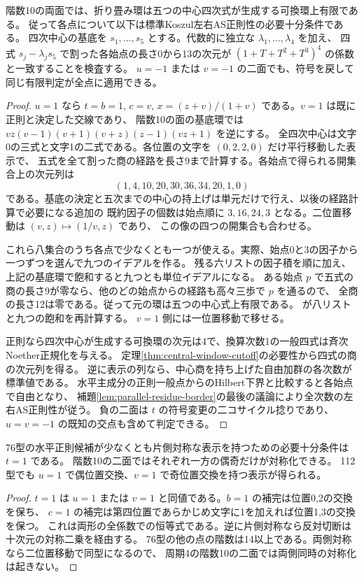 \begin{theorem}\label{thm:first-rectangle-edge-center}
階数10の両面では、折り畳み環は五つの中心四次式が生成する可換環上有限である。
従って各点について以下は標準Koszul左右AS正則性の必要十分条件である。
四次中心の基底を $s_1,\ldots,s_5$ とする。代数的に独立な $\lambda_1,\ldots,\lambda_4$ を加え、
四式 $s_j-\lambda_j s_5$ で割った各始点の長さ0から13の次元が $(1+T+T^2+T^3)^4$ の係数と一致することを検査する。
$u=-1$ または $v=-1$ の二面でも、符号を戻して同じ有限判定が全点に適用できる。
\end{theorem}
\begin{proof}
$u=1$ なら $t=b=1$, $c=v$, $x=(z+v)/(1+v)$ である。$v=1$ は既に正則と決定した交線であり、
階数10の面の基底環では $v z(v-1)(v+1)(v+z)(z-1)(vz+1)$ を逆にする。
全四次中心は文字0の三式と文字1の二式である。各位置の文字を $(0,2,2,0)$ だけ平行移動した表示で、
五式を全て割った商の経路を長さ9まで計算する。各始点で得られる開集合上の次元列は
\[
 (1,4,10,20,30,36,34,20,1,0)
\]
である。基底の決定と五次までの中心の持上げは単元だけで行え、以後の経路計算で必要になる追加の
既約因子の個数は始点順に $3,16,24,3$ となる。二位置移動は $(v,z)\mapsto(1/v,z)$ であり、
この像の四つの開集合も合わせる。

これら八集合のうち各点で少なくとも一つが使える。実際、始点0と3の因子から一つずつを選んで九つのイデアルを作る。
残る六リストの因子積を順に加え、上記の基底環で飽和すると九つとも単位イデアルになる。
ある始点 $p$ で五式の商の長さ9が零なら、他のどの始点からの経路も高々三歩で $p$ を通るので、
全商の長さ12は零である。従って元の環は五つの中心式上有限である。
 が八リストと九つの飽和を再計算する。
$v=1$ 側には一位置移動で移せる。

正則なら四次中心が生成する可換環の次元は4で、換算次数1の一般四式は斉次Noether正規化を与える。
定理\ref{thm:central-window-cutoff}の必要性から四式の商の次元列を得る。
逆に表示の列なら、中心商を持ち上げた自由加群の各次数が標準値である。
水平主成分の正則一般点からのHilbert下界と比較すると各始点で自由となり、
補題\ref{lem:parallel-residue-border}の最後の議論により全次数の左右AS正則性が従う。
負の二面は $t$ の符号変更の二コサイクル捻りであり、$u=v=-1$ の既知の交点も含めて判定できる。
\end{proof}

\begin{corollary}
76型の水平正則候補が少なくとも片側対称な表示を持つための必要十分条件は $t=1$ である。
階数10の二面ではそれぞれ一方の偶奇だけが対称化できる。
112型でも $u=1$ で偶位置交換、$v=1$ で奇位置交換を持つ表示が得られる。
\end{corollary}
\begin{proof}
$t=1$ は $u=1$ または $v=1$ と同値である。$b=1$ の補完は位置0,2の交換を保ち、
$c=1$ の補完は第四位置であらかじめ文字に1を加えれば位置1,3の交換を保つ。
これは両形の全係数での恒等式である。逆に片側対称なら反対切断は十次元の対称二乗を経由する。
76型の他の点の階数は14以上である。両側対称なら二位置移動で同型になるので、
周期4の階数10の二面では両側同時の対称化は起きない。
\end{proof}
